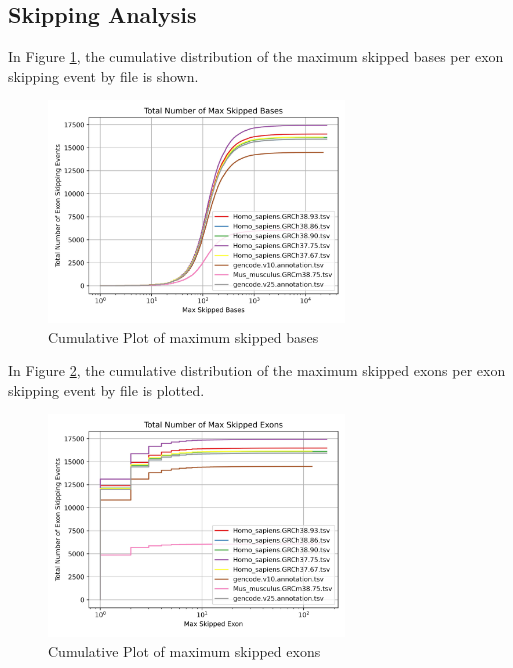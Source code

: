\documentclass{article}
\begin{document}
    \subsection{Skipping Analysis}

    In Figure \ref{fig:cum-max-skipped-bases}, the cumulative distribution of the maximum skipped bases per exon skipping event by file is shown.



    \begin{figure}
        \centering
        \includegraphics[width=0.7\textwidth]{figures/exonskipping/skipped_bases.jpg}
        \caption{Cumulative Plot of maximum skipped bases}
        \label{fig:cum-max-skipped-bases}
    \end{figure}


    In Figure \ref{fig:cum-max-skipped-exons}, the cumulative distribution of the maximum skipped exons per exon skipping event by file is plotted.

    \begin{figure}
        \centering
        \includegraphics[width=0.7\textwidth]{figures/exonskipping/skipped_exons.jpg}
        \caption{Cumulative Plot of maximum skipped exons}
        \label{fig:cum-max-skipped-exons}
    \end{figure}
\end{document}
